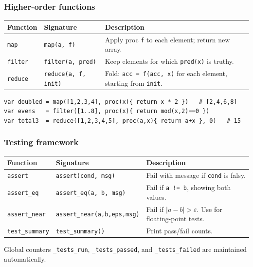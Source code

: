 \documentclass[11pt,a4paper]{article}
\begin{document}
\subsubsection{Higher-order functions}

\begin{longtable}{@{}L{3.5cm}L{5cm}L{6.5cm}@{}}
\toprule
\textbf{Function} & \textbf{Signature} & \textbf{Description} \\
\midrule
\endhead
\texttt{map}    & \texttt{map(a, f)}           & Apply proc \texttt{f} to each element; return new array. \\
\texttt{filter} & \texttt{filter(a, pred)}     & Keep elements for which \texttt{pred(x)} is truthy. \\
\texttt{reduce} & \texttt{reduce(a, f, init)}  & Fold: \texttt{acc = f(acc, x)} for each element, starting from \texttt{init}. \\
\bottomrule
\end{longtable}

\begin{lstlisting}
var doubled = map([1,2,3,4], proc(x){ return x * 2 })   # [2,4,6,8]
var evens   = filter([1..8], proc(x){ return mod(x,2)==0 })
var total3  = reduce([1,2,3,4,5], proc(a,x){ return a+x }, 0)   # 15
\end{lstlisting}

\subsubsection{Testing framework}

\begin{longtable}{@{}L{3.5cm}L{5cm}L{6.5cm}@{}}
\toprule
\textbf{Function} & \textbf{Signature} & \textbf{Description} \\
\midrule
\endhead
\texttt{assert}      & \texttt{assert(cond, msg)}      & Fail with message if \texttt{cond} is falsy. \\
\texttt{assert\_eq}  & \texttt{assert\_eq(a, b, msg)}  & Fail if \texttt{a != b}, showing both values. \\
\texttt{assert\_near}& \texttt{assert\_near(a,b,eps,msg)} & Fail if $|a - b| > \varepsilon$. Use for floating-point tests. \\
\texttt{test\_summary} & \texttt{test\_summary()}     & Print pass/fail counts. \\
\bottomrule
\end{longtable}

Global counters \texttt{\_tests\_run}, \texttt{\_tests\_passed}, and
\texttt{\_tests\_failed} are maintained automatically.
\end{document}
